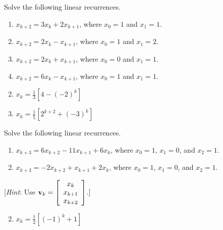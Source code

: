 \begin{multicols}{2}
\begin{ex}
Solve the following linear recurrences.


\begin{enumerate}[label={\alph*.}]
\item $x_{k+2} = 3x_{k} + 2x_{k+1}$, where $x_{0} = 1$ and $x_{1} = 1$.

\item $x_{k+2} = 2x_{k} - x_{k+1}$, where $x_{0} = 1$ and $x_{1} = 2$.

\item $x_{k+2} = 2x_{k} + x_{k+1}$, where $x_{0} = 0$ and $x_{1} = 1$.

\item $x_{k+2} = 6x_{k} - x_{k+1}$, where $x_{0} = 1$ and $x_{1} = 1$.

\end{enumerate}
\begin{sol}
\begin{enumerate}[label={\alph*.}]
\setcounter{enumi}{1}
\item  $x_k = \frac{1}{3} \left[ 4 - (-2)^k \right]$


\setcounter{enumi}{3}
\item  $x_k = \frac{1}{5} \left[ 2^{k+2} + (-3)^k \right]$


\end{enumerate}
\end{sol}
\end{ex}

\begin{ex}
Solve the following linear recurrences.


\begin{enumerate}[label={\alph*.}]
\item $x_{k+3} = 6x_{k+2} - 11x_{k+1} + 6x_{k}$, where $x_{0} = 1$, $x_{1} = 0$, and $x_{2} = 1$.
\columnbreak 

\item $x_{k+3} = -2x_{k+2} + x_{k+1} + 2x_{k}$, where $x_{0} = 1$, $x_{1} = 0$, and $x_{2} = 1$.

\end{enumerate}

[\textit{Hint}: Use $\textbf{v}_k = \left[ \begin{array}{c}
x_k \\
x_{k+1}\\
x_{k+2}
\end{array}\right]$.]


\begin{sol}
\begin{enumerate}[label={\alph*.}]
\setcounter{enumi}{1}
\item  $x_k = \frac{1}{2} \left[ (-1)^k + 1  \right]$



\end{enumerate}
\end{sol}
\end{ex}
\end{multicols}
